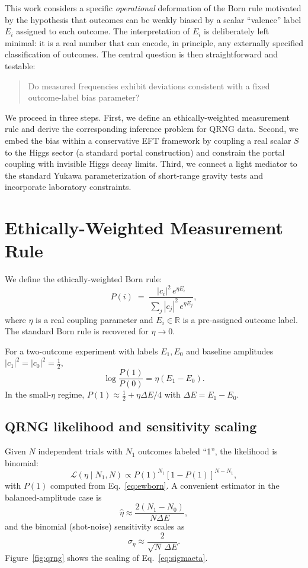 \documentclass[11pt]{article}
\begin{document}
This work considers a specific \emph{operational} deformation of the Born rule motivated by the hypothesis that outcomes can be weakly biased by a scalar ``valence'' label $E_i$ assigned to each outcome. The interpretation of $E_i$ is deliberately left minimal: it is a real number that can encode, in principle, any externally specified classification of outcomes. The central question is then straightforward and testable:
\begin{quote}
Do measured frequencies exhibit deviations consistent with a fixed outcome-label bias parameter?
\end{quote}

We proceed in three steps. First, we define an ethically-weighted measurement rule and derive the corresponding inference problem for QRNG data. Second, we embed the bias within a conservative EFT framework by coupling a real scalar $S$ to the Higgs sector (a standard portal construction) and constrain the portal coupling with invisible Higgs decay limits. Third, we connect a light mediator to the standard Yukawa parameterization of short-range gravity tests and incorporate laboratory constraints.

\section{Ethically-Weighted Measurement Rule}
We define the ethically-weighted Born rule:
\begin{equation}
P(i) \;=\; \frac{|c_i|^2 \, e^{\eta E_i}}{\sum_j |c_j|^2 \, e^{\eta E_j}},
\label{eq:ewborn}
\end{equation}
where $\eta$ is a real coupling parameter and $E_i\in\mathbb{R}$ is a pre-assigned outcome label. The standard Born rule is recovered for $\eta\to 0$.

For a two-outcome experiment with labels $E_1, E_0$ and baseline amplitudes $|c_1|^2=|c_0|^2=\tfrac12$,
\begin{equation}
\log\frac{P(1)}{P(0)} = \eta (E_1-E_0).
\label{eq:logodds}
\end{equation}
In the small-$\eta$ regime, $P(1)\approx \tfrac12 + \eta\Delta E/4$ with $\Delta E=E_1-E_0$.

\subsection{QRNG likelihood and sensitivity scaling}
Given $N$ independent trials with $N_1$ outcomes labeled ``1'', the likelihood is binomial:
\begin{equation}
\mathcal{L}(\eta \mid N_1,N) \propto P(1)^{N_1} [1-P(1)]^{N-N_1},
\end{equation}
with $P(1)$ computed from Eq.~\eqref{eq:ewborn}. A convenient estimator in the balanced-amplitude case is
\begin{equation}
\hat\eta \approx \frac{2(N_1-N_0)}{N \Delta E},
\end{equation}
and the binomial (shot-noise) sensitivity scales as
\begin{equation}
\sigma_\eta \approx \frac{2}{\sqrt{N}\,\Delta E}.
\label{eq:sigmaeta}
\end{equation}
Figure~\ref{fig:qrng} shows the scaling of Eq.~\eqref{eq:sigmaeta}.
\end{document}
